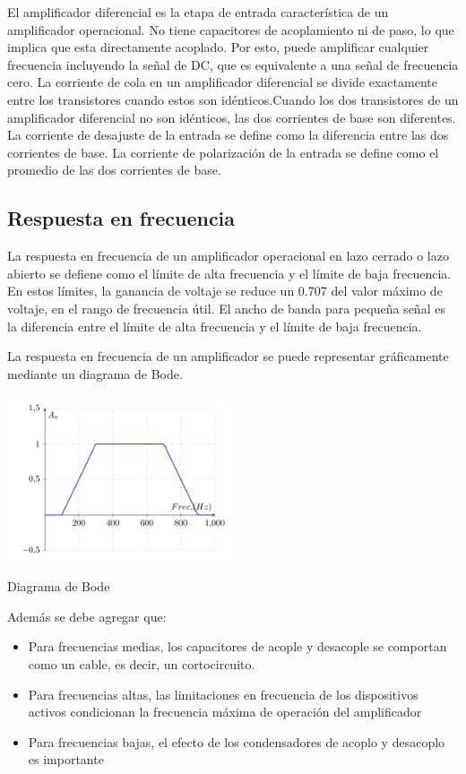 El amplificador diferencial es la etapa de entrada característica de un amplificador operacional. No tiene capacitores de acoplamiento ni de paso, lo que implica que esta directamente
acoplado. Por esto, puede amplificar cualquier frecuencia incluyendo la señal de DC, que es
equivalente a una señal de frecuencia cero. La corriente de cola en un amplificador diferencial se divide exactamente entre los transistores cuando estos son idénticos.Cuando los dos
transistores de un amplificador diferencial no son idénticos, las dos corrientes de base son
diferentes. La corriente de desajuste de la entrada se define como la diferencia entre las dos
corrientes de base. La corriente de polarización de la entrada se define como el promedio de
las dos corrientes de base.

\subsection{Respuesta en frecuencia}

La respuesta en frecuencia de un amplificador operacional en lazo cerrado o lazo abierto
se defiene como el límite de alta frecuencia y el límite de baja frecuencia. En estos límites, la
ganancia de voltaje se reduce un 0.707 del valor máximo de voltaje, en el rango de frecuencia
útil.
El ancho de banda para pequeña señal es la diferencia entre el límite de alta frecuencia
y el límite de baja frecuencia.

La respuesta en frecuencia de un amplificador se puede representar gráficamente mediante un diagrama de Bode.

\begin{ilustracion}[ht]
    \centering
    \includegraphics[width=0.5\textwidth]{src/images/marco-teorico/diagrama-de-bode.png}
    \caption{Diagrama de Bode}
    \label{ilus:mt-diagrama-de-bode}
\end{ilustracion}

Además se debe agregar que:

\begin{itemize}
    \item Para frecuencias medias, los capacitores de acople y desacople se comportan como un
cable, es decir, un cortocircuito.
    \item Para frecuencias altas, las limitaciones en frecuencia de los dispositivos activos condicionan la frecuencia máxima de operación del amplificador
    \item Para frecuencias bajas, el efecto de los condensadores de acoplo y desacoplo es importante
\end{itemize}

